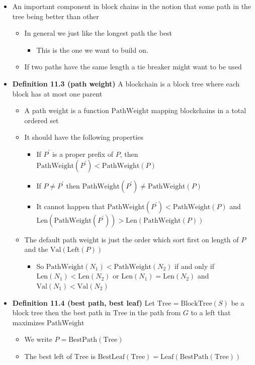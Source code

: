 \documentclass[11pt]{article}
\begin{document}
\begin{itemize}
\item An important component in block chains in the notion that some path in the tree being better than other
\begin{itemize}
\item In general we just like the longest path the best
\begin{itemize}
\item This is the one we want to build on.
\end{itemize}
\item If two paths have the same length a tie breaker might want to be used
\end{itemize}

\item \textbf{Definition 11.3 (path weight)} A blockchain is a block tree where each block has at most one parent
\begin{itemize}
\item A path weight is a function \(\text{PathWeight}\) mapping blockchains in a total ordered set
\item It should have the following properties
\begin{itemize}
\item If \(P^'\) is a proper prefix of \(P\), then \(\text{PathWeight}(P^{'}) < \text{PathWeight}(P)\)
\item If \(P \ne P^'\) then \(\text{PathWeight}(P^{'}) \neq \text{PathWeight}(P)\)
\item It cannot happen that \(\text{PathWeight}(P^{'}) < \text{PathWeight}(P)\) and \(\text{Len}(\text{PathWeight}(P^{'})) > \text{Len}(\text{PathWeight}(P))\)
\end{itemize}
\item The default path weight is just the order which sort first on length of \(P\) and the \(\text{Val}(\text{Left}(P))\)
\begin{itemize}
\item So \(\text{PathWeight}(N_1) < \text{PathWeight}(N_2)\) if and only if \(\text{Len}(N_1) < \text{Len}(N_2)\) or \(\text{Len}(N_1) = \text{Len}(N_2)\) and \(\text{Val}(N_1) < \text{Val}(N_2)\)
\end{itemize}
\end{itemize}

\item \textbf{Definition 11.4 (best path, best leaf)} Let \(\text{Tree} = \text{BlockTree}(S)\) be a block tree then the best path in \(\text{Tree}\) in the path from \(G\) to a left that maximizes \(\text{PathWeight}\)
\begin{itemize}
\item We write \(P = \text{BestPath}(\text{Tree})\)
\item The best left of \(\text{Tree}\) is \(\text{BestLeaf}(\text{Tree}) = \text{Leaf}(\text{BestPath}(\text{Tree}))\)
\end{itemize}


\end{itemize}
\end{document}
